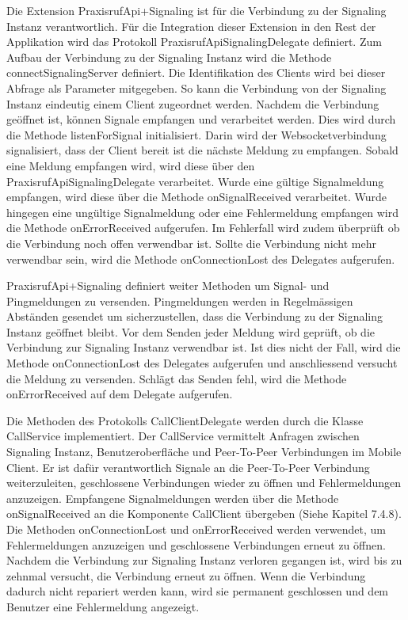 Die Extension PraxisrufApi+Signaling ist für die Verbindung zu der Signaling Instanz verantwortlich.
Für die Integration dieser Extension in den Rest der Applikation wird das Protokoll PraxisrufApiSignalingDelegate definiert.
Zum Aufbau der Verbindung zu der Signaling Instanz wird die Methode connectSignalingServer definiert.
Die Identifikation des Clients wird bei dieser Abfrage als Parameter mitgegeben.
So kann die Verbindung von der Signaling Instanz eindeutig einem Client zugeordnet werden.
Nachdem die Verbindung geöffnet ist, können Signale empfangen und verarbeitet werden.
Dies wird durch die Methode listenForSignal initialisiert.
Darin wird der Websocketverbindung signalisiert, dass der Client bereit ist die nächste Meldung zu empfangen.
Sobald eine Meldung empfangen wird, wird diese über den PraxisrufApiSignalingDelegate verarbeitet.
Wurde eine gültige Signalmeldung empfangen, wird diese über die Methode onSignalReceived verarbeitet.
Wurde hingegen eine ungültige Signalmeldung oder eine Fehlermeldung empfangen wird die Methode onErrorReceived aufgerufen.
Im Fehlerfall wird zudem überprüft ob die Verbindung noch offen verwendbar ist.
Sollte die Verbindung nicht mehr verwendbar sein, wird die Methode onConnectionLost des Delegates aufgerufen.

PraxisrufApi+Signaling definiert weiter Methoden um Signal- und Pingmeldungen zu versenden.
Pingmeldungen werden in Regelmässigen Abständen gesendet um sicherzustellen, dass die Verbindung zu der Signaling Instanz geöffnet bleibt.
Vor dem Senden jeder Meldung wird geprüft, ob die Verbindung zur Signaling Instanz verwendbar ist.
Ist dies nicht der Fall, wird die Methode onConnectionLost des Delegates aufgerufen und anschliessend versucht die Meldung zu versenden.
Schlägt das Senden fehl, wird die Methode onErrorReceived auf dem Delegate aufgerufen.

Die Methoden des Protokolls CallClientDelegate werden durch die Klasse CallService implementiert.
Der CallService vermittelt Anfragen zwischen Signaling Instanz, Benutzeroberfläche und Peer-To-Peer Verbindungen im Mobile Client.
Er ist dafür verantwortlich Signale an die Peer-To-Peer Verbindung weiterzuleiten, geschlossene Verbindungen wieder zu öffnen und Fehlermeldungen anzuzeigen.
Empfangene Signalmeldungen werden über die Methode onSignalReceived an die Komponente CallClient übergeben (Siehe Kapitel 7.4.8).
Die Methoden onConnectionLost und onErrorReceived werden verwendet, um Fehlermeldungen anzuzeigen und geschlossene Verbindungen erneut zu öffnen.
Nachdem die Verbindung zur Signaling Instanz verloren gegangen ist, wird bis zu zehnmal versucht, die Verbindung erneut zu öffnen.
Wenn die Verbindung dadurch nicht repariert werden kann, wird sie permanent geschlossen und dem Benutzer eine Fehlermeldung angezeigt.



